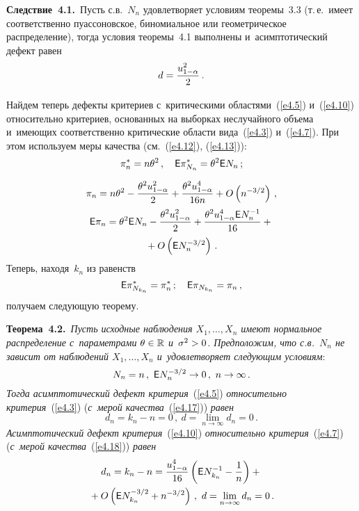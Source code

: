 \begin{multicols}{2}
\noindent
\textbf{Следствие~4.1.}\ Пусть с.в.~$N_n$ удовлетворяет условиям 
теоремы~3.3 (т.\,е.\ имеет соответственно пуассоновское, биномиальное или 
геометрическое распределение), тогда условия теоремы~4.1 выполнены и~асимптотический 
дефект равен
$$
d = \displaystyle\frac{\displaystyle u_{1-\alpha}^2\mathstrut}{\displaystyle 2\mathstrut}\,.
$$

Найдем теперь дефекты критериев с~критическими областями~(\ref{e4.5}) и~(\ref{e4.10}) относительно 
критериев, основанных на выборках неслучайного объема и~имеющих соответственно 
критические области вида~(\ref{e4.3}) и~(\ref{e4.7}). При этом используем меры качества 
(см.~(\ref{e4.12}), (\ref{e4.13})):
\begin{equation}
\pi_n^* = n \theta^2\,,\quad 
{\sf E} \pi_{N_n}^* = \theta^2 {\sf E} N_{n}\,;
\label{e4.17}
\end{equation}

\vspace*{-12pt}

\noindent
\begin{multline}
\pi_n = n \theta^2 - \displaystyle\frac{\displaystyle \theta^2u_{1-\alpha}^2\mathstrut}{\displaystyle 2\mathstrut} + 
\displaystyle\frac{\displaystyle \theta^2u_{1-\alpha}^4\mathstrut}{\displaystyle 16n\mathstrut} +  O\left(n^{-3/2}\right)\,,
\\
{\sf E} \pi_n = \theta^2 {\sf E} N_n - \displaystyle\frac{\displaystyle \theta^2u_{1-\alpha}^2\mathstrut}{\displaystyle 2\mathstrut} + 
\displaystyle\frac{\displaystyle \theta^2u_{1-\alpha}^4 {\sf E} N_n^{-1}\mathstrut}{\displaystyle 16\mathstrut} +{}\\
{}+  O\left({\sf E} N_n^{-3/2}\right)\,.
\label{e4.18}
\end{multline}
Теперь, находя~$k_n$ из равенств
$$
{\sf E} \pi_{N_{k_n}}^* = \pi_n^*\,;\quad  {\sf E} \pi_{N_{k_n}} = \pi_n\,,
$$
получаем следующую теорему.

\smallskip

\noindent
\textbf{Теорема~4.2.}\ \textit{Пусть исходные наблюдения $X_1,\ldots,X_n$ 
имеют нормальное 
распределение с~параметрами $\theta\hm \in \mathbb{R}$ и~$\sigma^2\hm > 0$. 
Предположим, что с.в.~$N_{n}$ не зависит от 
наблюдений $X_1,\ldots,X_n$ и~удовлетворяет сле\-ду\-ющим условиям}:
$$
N_n = n\,,\ {\sf E} N_{n}^{-3/2} \to 0\,,\  n \to \infty\,.
$$
\textit{Тогда асимптотический дефект критерия}~(\ref{e4.5}) 
\textit{относительно критерия}~(\ref{e4.3}) 
(\textit{с~мерой качества}~(\ref{e4.17})) \textit{равен}
$$
d_n = k_n - n = 0\,, \  d = \lim\limits_{n\to\infty} d_n = 0\,.
$$
\textit{Асимптотический дефект критерия}~(\ref{e4.10}) 
\textit{относительно критерия}~(\ref{e4.7}) 
(\textit{с~мерой качества}~(\ref{e4.18})) \textit{равен}
\begin{multline*}
d_n = k_n - n = \fr{u^4_{1-\alpha}}{16}\left({\sf E} N^{-1}_{k_n} - \fr{1}{n}\right) +{}\\
{}+
 O\left({\sf E} N_{k_n}^{-3/2} + n^{-3/2}\right)\,, \ 
 d = \lim\limits_{n\to\infty} d_n = 0\,.
\end{multline*}



\end{multicols}
